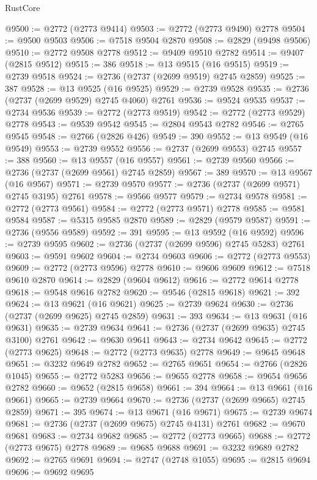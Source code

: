 \begin{lexlean}{RustCore}
\begin{coremodule}
@9500 := @2772 (@2773 @9414)
@9503 := @2772 (@2773 @9490) @2778
@9504 := @9500 @9503
@9506 := @7518 @9504 @2870
@9508 := @2829 (@9498 @9506)
@9510 := @2772 @9508 @2778
@9512 := @9409 @9510 @2782
@9514 := @9407 (@2815 @9512)
@9515 := 386
@9518 := @13 @9515 (@16 @9515)
@9519 := @2739 @9518
@9524 := @2736 (@2737 (@2699 @9519) @2745 @2859)
@9525 := 387
@9528 := @13 @9525 (@16 @9525)
@9529 := @2739 @9528
@9535 := @2736 (@2737 (@2699 @9529) @2745 @4060) @2761
@9536 := @9524 @9535
@9537 := @2734 @9536
@9539 := @2772 (@2773 @9519)
@9542 := @2772 (@2773 @9529) @2778
@9543 := @9539 @9542
@9545 := @2804 @9543 @2782
@9546 := @2765 @9545
@9548 := @2766 (@2826 @426)
@9549 := 390
@9552 := @13 @9549 (@16 @9549)
@9553 := @2739 @9552
@9556 := @2737 (@2699 @9553) @2745
@9557 := 388
@9560 := @13 @9557 (@16 @9557)
@9561 := @2739 @9560
@9566 := @2736 (@2737 (@2699 @9561) @2745 @2859)
@9567 := 389
@9570 := @13 @9567 (@16 @9567)
@9571 := @2739 @9570
@9577 := @2736 (@2737 (@2699 @9571) @2745 @3195) @2761
@9578 := @9566 @9577
@9579 := @2734 @9578
@9581 := @2772 (@2773 @9561)
@9584 := @2772 (@2773 @9571) @2778
@9585 := @9581 @9584
@9587 := @5315 @9585 @2870
@9589 := @2829 (@9579 @9587)
@9591 := @2736 (@9556 @9589)
@9592 := 391
@9595 := @13 @9592 (@16 @9592)
@9596 := @2739 @9595
@9602 := @2736 (@2737 (@2699 @9596) @2745 @5283) @2761
@9603 := @9591 @9602
@9604 := @2734 @9603
@9606 := @2772 (@2773 @9553)
@9609 := @2772 (@2773 @9596) @2778
@9610 := @9606 @9609
@9612 := @7518 @9610 @2870
@9614 := @2829 (@9604 @9612)
@9616 := @2772 @9614 @2778
@9618 := @9548 @9616 @2782
@9620 := @9546 (@2815 @9618)
@9621 := 392
@9624 := @13 @9621 (@16 @9621)
@9625 := @2739 @9624
@9630 := @2736 (@2737 (@2699 @9625) @2745 @2859)
@9631 := 393
@9634 := @13 @9631 (@16 @9631)
@9635 := @2739 @9634
@9641 := @2736 (@2737 (@2699 @9635) @2745 @3100) @2761
@9642 := @9630 @9641
@9643 := @2734 @9642
@9645 := @2772 (@2773 @9625)
@9648 := @2772 (@2773 @9635) @2778
@9649 := @9645 @9648
@9651 := @3232 @9649 @2782
@9652 := @2765 @9651
@9654 := @2766 (@2826 @1045)
@9655 := @2772 @5283
@9656 := @9655 @2778
@9658 := @9654 @9656 @2782
@9660 := @9652 (@2815 @9658)
@9661 := 394
@9664 := @13 @9661 (@16 @9661)
@9665 := @2739 @9664
@9670 := @2736 (@2737 (@2699 @9665) @2745 @2859)
@9671 := 395
@9674 := @13 @9671 (@16 @9671)
@9675 := @2739 @9674
@9681 := @2736 (@2737 (@2699 @9675) @2745 @4131) @2761
@9682 := @9670 @9681
@9683 := @2734 @9682
@9685 := @2772 (@2773 @9665)
@9688 := @2772 (@2773 @9675) @2778
@9689 := @9685 @9688
@9691 := @3232 @9689 @2782
@9692 := @2765 @9691
@9694 := @2747 (@2748 @1055)
@9695 := @2815 @9694
@9696 := @9692 @9695

\end{coremodule}
\end{lexlean}
